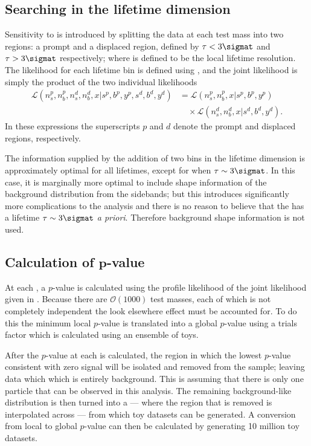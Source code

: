 \subsection{Searching in the lifetime dimension}
Sensitivity to \lifetime{\db} is introduced by splitting the data at each test mass into two
regions: a prompt and a displaced region, defined by $\tau<3\sigmat$ and
$\tau>3\sigmat$ respectively; where \sigmat is defined to be the local lifetime resolution.
The likelihood for each lifetime bin is defined using , and the joint likelihood is
simply the product of the two
individual likelihoods
\begin{align}
  \mathcal{L}(n^p_s, n^p_b, n^d_s, n^d_b, x | s^p, b^p, y^p, s^d, b^d, y^d) &=
  \mathcal{L}(n^p_s, n^p_b, x | s^p, b^p, y^p)\nonumber\\
  &\quad\times\mathcal{L}(n^d_s, n^d_b, x | s^d, b^d, y^d).
  \label{eq:db:liketau}
\end{align}
In these expressions the superscripts $p$ and $d$ denote the prompt and displaced regions,
respectively.

The information supplied by the addition of two bins in the lifetime dimension is approximately
optimal for all \db lifetimes, except for when $\tau\sim3\sigmat$.
In this case, it is marginally more optimal to include shape information of the background
distribution from the sidebands; but this introduces
significantly more complications to the analysis and there is no reason to believe that the \db has
a lifetime $\tau\sim3\sigmat$ \emph{a priori}.
Therefore background shape information is not used.


\subsection[Calculation of $p$-value]
{Calculation of $\boldsymbol{p}$-value}
At each , a $p$-value is calculated using the profile likelihood of the joint likelihood given
in .
Because there are $\mathcal{O}(1000)$ test masses, each of which is not completely independent the
look elsewhere effect must be accounted for.
To do this the minimum local $p$-value is translated into a global $p$-value using a trials factor
which is calculated using an ensemble of toys.

After the $p$-value at each  is calculated, the region in which the lowest $p$-value
consistent with zero signal will be isolated and removed from the sample; leaving data which
which is entirely background.
This is assuming that there is only one \np particle that can be observed in this analysis.
The remaining background-like distribution is then turned into a \PDF --- where the region that is
removed is interpolated across --- from which toy datasets can be generated.
A conversion from local to global $p$-value can then be calculated by generating 10 million toy
datasets.


